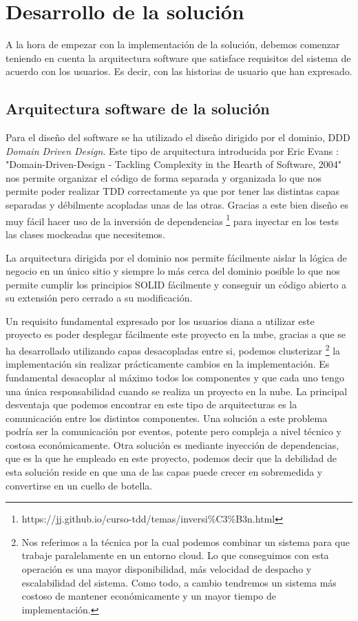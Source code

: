 \chapter{Desarrollo de la solución}
A la hora de empezar con la implementación de la solución, debemos comenzar teniendo en cuenta la arquitectura software que satisface requisitos del sistema de acuerdo con los usuarios. Es decir, con las historias de usuario que han expresado.

\section{Arquitectura software de la solución}
Para el diseño del software se ha utilizado el diseño dirigido por el dominio, DDD \textit{Domain Driven Design}. Este tipo de arquitectura introducida por Eric Evans \cite{ddd_book}: "Domain-Driven-Design - Tackling Complexity in the Hearth of Software, 2004" nos permite organizar el código de forma separada y organizada lo que nos permite poder realizar TDD correctamente ya que por tener las distintas capas separadas y débilmente acopladas unas de las otras. Gracias a este bien diseño es muy fácil hacer uso de la inversión de dependencias \footnote{https://jj.github.io/curso-tdd/temas/inversi\%C3\%B3n.html} para inyectar en los tests las clases mockeadas que necesitemos. 

La arquitectura dirigida por el dominio nos permite fácilmente aislar la lógica de negocio en un único sitio y siempre lo más cerca del dominio posible lo que nos permite cumplir los principios SOLID fácilmente y conseguir un código abierto a su extensión pero cerrado a su modificación.  

Un requisito fundamental expresado por los usuarios diana a utilizar este proyecto es poder desplegar fácilmente este proyecto en la nube, gracias a que se ha desarrollado utilizando capas desacopladas entre si, podemos clusterizar \footnote{Nos referimos a la técnica por la cual podemos combinar un sistema para que trabaje paralelamente en un entorno cloud. Lo que conseguimos con esta operación es una mayor disponibilidad, más velocidad de despacho y escalabilidad del sistema. Como todo, a cambio tendremos un sistema más costoso de mantener económicamente y un mayor tiempo de implementación. } la implementación sin realizar prácticamente cambios en la implementación.  Es fundamental desacoplar al máximo todos los componentes y que cada uno tengo una única responsabilidad cuando se realiza un proyecto en la nube. La principal desventaja que podemos encontrar en este tipo de arquitecturas es la comunicación entre los distintos componentes.  Una solución a este problema podría ser la comunicación por eventos, potente pero compleja a nivel técnico y costosa económicamente. Otra solución es mediante inyección de dependencias, que es la que he empleado en este proyecto, podemos decir que la debilidad de esta solución reside en que una de las capas puede crecer en sobremedida y convertirse en un cuello de botella.




